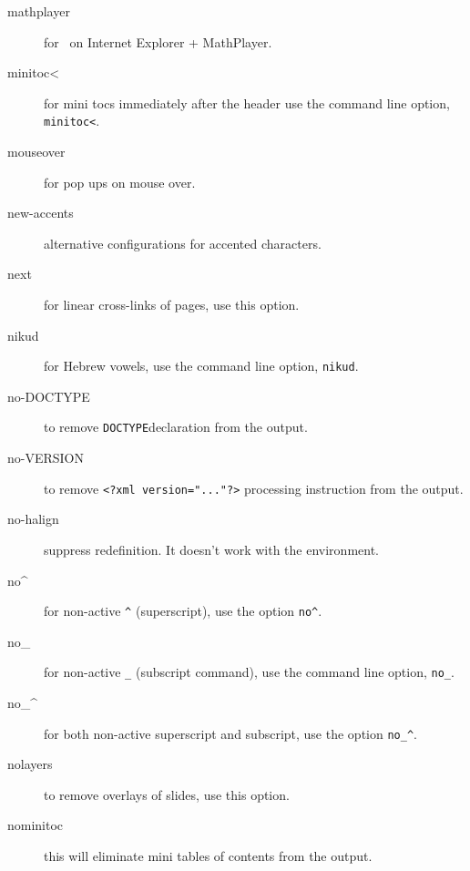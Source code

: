 \begin{description}
\item[mathplayer] for \mathml\ on Internet Explorer + MathPlayer.

\item[minitoc<] for mini tocs immediately after the header use the
  command line option, \verb=minitoc<=.

\item[mouseover] for pop ups on mouse over.

\item[new-accents] alternative configurations for accented characters. 

\item[next] for linear cross-links of pages, use this option.

\item[nikud] for Hebrew vowels, use the command line option,
  \verb=nikud=.

\item[no-DOCTYPE] to remove \texttt{DOCTYPE}\space declaration from
  the output.

\item[no-VERSION] to remove \verb+<?xml version="..."?>+ processing
  instruction from the output.

\item[no-halign] suppress \texcommand{\halign} redefinition. It doesn't work with the  environment.

\item[no\textasciicircum] for non-active \verb=^= (superscript), use the option
  \verb=no^=.

\item[no\_] for non-active \verb=_= (subscript command), use the
  command line option, \verb=no_=.

\item[no\_\textasciicircum] for both non-active superscript and subscript, use the
  option \verb=no_^=.

\item[nolayers] to remove overlays of slides, use this option.

\item[nominitoc] this will eliminate mini tables of contents from the
  output.


\end{description}
